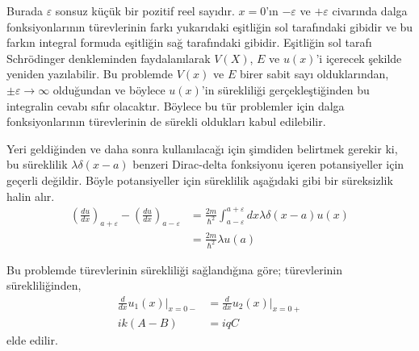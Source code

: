\documentclass[a4paper,12pt, twoside]{article}
\begin{document}
Burada $\varepsilon$ sonsuz küçük bir pozitif reel sayıdır. $x=0$'ın $-\varepsilon$ ve $+\varepsilon$ civarında dalga fonksiyonlarının türevlerinin farkı yukarıdaki eşitliğin sol tarafındaki gibidir ve bu farkın integral formuda eşitliğin sağ tarafındaki gibidir. Eşitliğin sol tarafı Schrödinger denkleminden faydalanılarak $V(X)$, $E$ ve $u(x)$'i içerecek şekilde yeniden yazılabilir. Bu problemde $V(x)$ ve $E$ birer sabit sayı olduklarından, $\pm \varepsilon \rightarrow \infty$ olduğundan ve böylece $u(x)$'in sürekliliği gerçekleştiğinden bu integralin cevabı sıfır olacaktır. Böylece bu tür problemler için dalga fonksiyonlarının türevlerinin de  sürekli oldukları kabul edilebilir. 

Yeri geldiğinden ve daha sonra kullanılacağı için şimdiden belirtmek gerekir ki, bu süreklilik $\lambda \delta(x-a)$ benzeri Dirac-delta fonksiyonu içeren potansiyeller için geçerli değildir. Böyle potansiyeller için süreklilik aşağıdaki gibi bir süreksizlik halin alır.
\begin{equation}
\begin{aligned} \left( \frac { d u } { d x } \right) _ { a + \varepsilon } - \left( \frac { d u } { d x } \right) _ { a - \varepsilon } & = \frac { 2 m } { \hbar ^ { 2 } } \int _ { a - \varepsilon } ^ { a + \varepsilon } d x \lambda \delta ( x - a ) u ( x ) \\ & = \frac { 2 m } { \hbar ^ { 2 } } \lambda u ( a ) \end{aligned}
\end{equation}

Bu problemde türevlerinin sürekliliği sağlandığına göre; türevlerinin sürekliliğinden,
\begin{align}
\frac{d}{dx}u_1(x) \bigg|_{x=0-} &= \frac{d}{dx}u_2(x) \bigg|_{x=0+} \\
i k ( A - B ) &= i q C
\end{align}
elde edilir.
\end{document}
